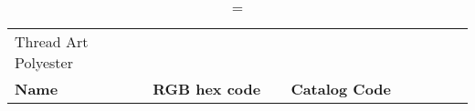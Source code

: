 
\begin{longtable}{p{0.3\linewidth} p{0.3\linewidth} p{0.4\linewidth}}
\caption = {Thread Art Polyester}
\label{tblr:threadartpoly}\\
\textbf{Name} & \textbf{RGB hex code} & \textbf{Catalog Code} \\

\end{longtable}
